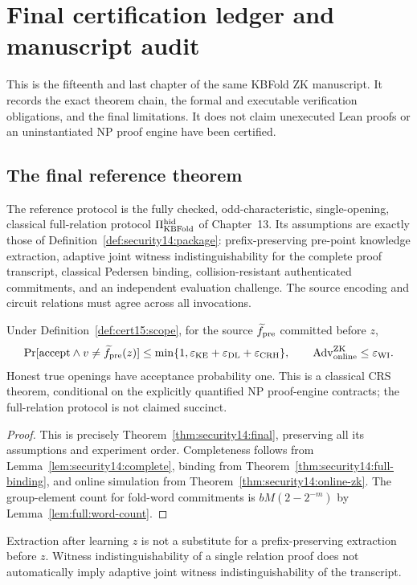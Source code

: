 \section{Final certification ledger and manuscript audit}\label{sec:cert15}
This is the fifteenth and last chapter of the same KBFold ZK manuscript. It records the exact theorem chain, the formal and executable verification obligations, and the final limitations. It does not claim unexecuted Lean proofs or an uninstantiated NP proof engine have been certified.

\subsection{The final reference theorem}
\begin{definition}[Scope]\label{def:cert15:scope}
The reference protocol is the fully checked, odd-characteristic, single-opening, classical full-relation protocol $\Pi_{\rm KBFold}^{\rm hid}$ of Chapter~13. Its assumptions are exactly those of Definition~\ref{def:security14:package}: prefix-preserving pre-point knowledge extraction, adaptive joint witness indistinguishability for the complete proof transcript, classical Pedersen binding, collision-resistant authenticated commitments, and an independent evaluation challenge. The source encoding and circuit relations must agree across all invocations.
\end{definition}
\begin{theorem}\label{thm:cert15:final}
Under Definition~\ref{def:cert15:scope}, for the source $\widetilde f_{\rm pre}$ committed before $z$,
\[
\Pr[\mathrm{accept}\wedge v\ne \widetilde f_{\rm pre}(z)]
\le\min\{1,\varepsilon_{\rm KE}+\varepsilon_{\rm DL}+\varepsilon_{\rm CRH}\},
\qquad
\operatorname{Adv}^{\rm ZK}_{\rm online}\le\varepsilon_{\rm WI}.
\]
Honest true openings have acceptance probability one. This is a classical CRS theorem, conditional on the explicitly quantified NP proof-engine contracts; the full-relation protocol is not claimed succinct.
\end{theorem}
\begin{proof}
This is precisely Theorem~\ref{thm:security14:final}, preserving all its assumptions and experiment order. Completeness follows from Lemma~\ref{lem:security14:complete}, binding from Theorem~\ref{thm:security14:full-binding}, and online simulation from Theorem~\ref{thm:security14:online-zk}. The group-element count for fold-word commitments is $bM(2-2^{-m})$ by Lemma~\ref{lem:full:word-count}.
\end{proof}
\begin{remark}[Chronology]
Extraction after learning $z$ is not a substitute for a prefix-preserving extraction before $z$. Witness indistinguishability of a single relation proof does not automatically imply adaptive joint witness indistinguishability of the transcript.
\end{remark}

